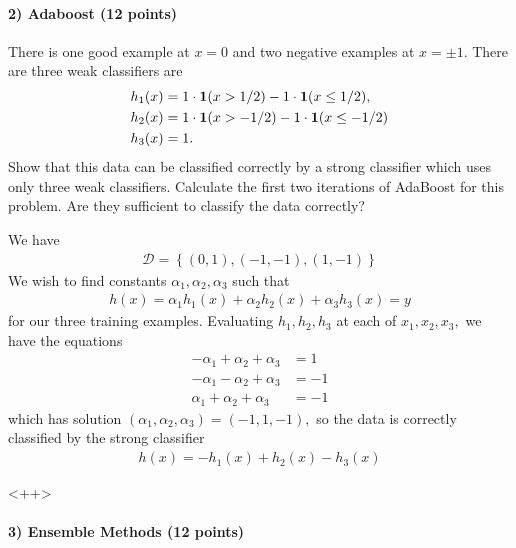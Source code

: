 \documentclass{article}
\begin{document}
\paragraph{2) Adaboost (12 points)} There is one good example at $x=0$ and two negative examples at $x = \pm 1$. There are three weak classifiers are
\begin{align*}
	h_1(x) & = 1\cdot{\bf1}(x > 1/2) -1\cdot{\bf1}(x \leq 1/2),\\
	h_2(x) & = 1\cdot{\bf1}(x > -1/2) -1\cdot{\bf1}(x \leq -1/2)\\
	h_3(x) & =1.
\end{align*}
Show that this data can be classified correctly by a strong classifier which uses only three weak classifiers. Calculate the first two iterations of AdaBoost for this problem. Are they sufficient to classify the data correctly?
\begin{soln}
	We have
	\begin{align*}
		\mathcal D = \left\{ (0, 1), (-1, -1), (1, -1) \right\}
	\end{align*}
	We wish to find constants $\alpha_1, \alpha_2, \alpha_3$ such that
	\begin{align*}
		h(x) = \alpha_1h_1(x) + \alpha_2h_2(x) + \alpha_3h_3(x) = y
	\end{align*}
	for our three training examples. Evaluating $h_1, h_2, h_3$ at each of $x_1, x_2, x_3,$ we have the equations
	\begin{align*}
		-\alpha_1 + \alpha_2 + \alpha_3 &= 1 \\
		-\alpha_1 - \alpha_2 + \alpha_3 &= -1 \\
		\alpha_1+\alpha_2+\alpha_3 &= -1
	\end{align*}
	which has solution $(\alpha_1, \alpha_2, \alpha_3) = (-1, 1, -1),$ so the data is correctly classified by the strong classifier 
	\begin{align*}
		h(x) = -h_1(x) + h_2(x) - h_3(x)
	\end{align*}

\end{soln}<++>

\paragraph{3) Ensemble Methods (12 points)}
\end{document}

